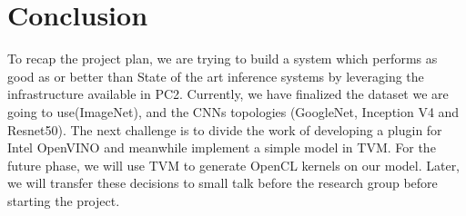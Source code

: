 \documentclass[titlepage]{report}
\begin{document}

\chapter{Conclusion}

To recap the project plan, we are trying to build a system which performs as good as or better than State of the art inference systems by leveraging the infrastructure available in PC2. Currently, we have finalized the dataset we are going to use(ImageNet), and the CNNs topologies (GoogleNet, Inception V4 and Resnet50). The next challenge is to divide the work of developing a plugin for Intel OpenVINO and meanwhile implement a simple model in TVM. For the future phase, we will use TVM to generate OpenCL kernels on our model. Later, we will transfer these decisions to small talk before the research group before starting the project.

\end{document}

